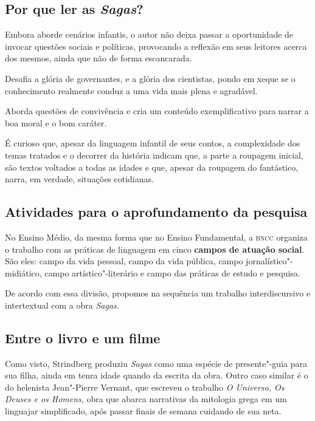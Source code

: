 \documentclass[12pt]{extarticle}
\begin{document}
\subsection{Por que ler as \emph{Sagas}?}

Embora aborde cenários infantis, o autor não deixa passar a oportunidade
de invocar questões sociais e políticas, provocando a reflexão em seus
leitores acerca dos mesmos, ainda que não de forma escancarada.

Desafia a glória de governantes, e a glória dos cientistas, pondo em
xeque se o conhecimento realmente conduz a uma vida mais plena e
agradável.

Aborda questões de convivência e cria um conteúdo exemplificativo para
narrar a boa moral e o bom caráter.

É curioso que, apesar da linguagem infantil de seus contos, a
complexidade dos temas tratados e o decorrer da história indicam que, a
parte a roupagem inicial, são textos voltados a todas as idades e que,
apesar da roupagem do fantástico, narra, em verdade, situações
cotidianas.

\subsection{Atividades para o aprofundamento da pesquisa}


No Ensino Médio, da mesma forma que no Ensino Fundamental, a \textsc{bncc}
organiza o trabalho com as práticas de linguagem em cinco \textbf{campos
de atuação social}. São eles: campo da vida pessoal, campo da vida
pública, campo jornalístico"-midiático, campo artístico"-literário e campo
das práticas de estudo e pesquisa.

De acordo com essa divisão, propomos na sequência um trabalho
interdiscursivo e intertextual com a obra \emph{Sagas.}



\subsection{Entre o livro e um filme}


Como visto, Strindberg produziu \emph{Sagas} como uma espécie de
presente"-guia para sua filha, ainda em tenra idade quando da escrita
da obra. Outro caso similar é o do helenista Jean"-Pierre Vernant, que
escreveu o trabalho \emph{O Universo, Os Deuses e os Homens}, obra que
abarca narrativas da mitologia grega em um linguajar simplificado,
após passar finais de semana cuidando de sua neta.
\end{document}
